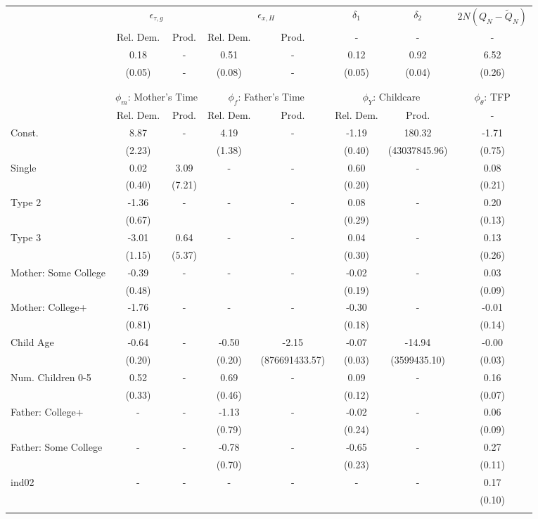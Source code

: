 \begin{tabular}{lccccccc}\toprule
 & \multicolumn{2}{c}{$\epsilon_{\tau,g}$} & \multicolumn{2}{c}{$\epsilon_{x,H}$} & {$\delta_{1}$} & {$\delta_{2}$} & $2N(Q_{N} - \tilde{Q}_{N})$ \\
 & Rel. Dem. & Prod. & Rel. Dem. & Prod. & - & - & - \\\cmidrule(r){2-3}\cmidrule(r){4-5}\cmidrule(r){6-6}\cmidrule(r){7-7}\cmidrule(r){8-8}
&0.18& - &0.51& - &0.12&0.92&6.52\\
&(0.05)& - &(0.08)& - &(0.05)&(0.04)&(0.26)\\
\\
&&&&&&&\\
 & \multicolumn{2}{c}{$\phi_{m}$: Mother's Time} & \multicolumn{2}{c}{$\phi_{f}$: Father's Time} & \multicolumn{2}{c}{$\phi_{Y}$: Childcare} &{$\phi_{\theta}$: TFP} \\
 & Rel. Dem. & Prod. & Rel. Dem. & Prod. & Rel. Dem. & Prod. & -  \\\cmidrule(r){2-3}\cmidrule(r){4-5}\cmidrule(r){6-7}\cmidrule(r){8-8}
Const.&8.87& -&4.19& -&-1.19&180.32&-1.71\\
&(2.23)&&(1.38)&&(0.40)&(43037845.96)&(0.75)\\
Single&0.02&3.09& - & -&0.60& -&0.08\\
&(0.40)&(7.21) & &&(0.20)&&(0.21)\\
Type 2&-1.36& -& - & -&0.08& -&0.20\\
&(0.67)& & &&(0.29)&&(0.13)\\
Type 3&-3.01&0.64& - & -&0.04& -&0.13\\
&(1.15)&(5.37) & &&(0.30)&&(0.26)\\
Mother: Some College&-0.39& -& - & -&-0.02& -&0.03\\
&(0.48)& & &&(0.19)&&(0.09)\\
Mother: College+&-1.76& -& - & -&-0.30& -&-0.01\\
&(0.81)& & &&(0.18)&&(0.14)\\
Child Age&-0.64& -&-0.50&-2.15&-0.07&-14.94&-0.00\\
&(0.20)&&(0.20)&(876691433.57)&(0.03)&(3599435.10)&(0.03)\\
Num. Children 0-5&0.52& -&0.69& -&0.09& -&0.16\\
&(0.33)&&(0.46)&&(0.12)&&(0.07)\\
Father: College+& - & -&-1.13& -&-0.02& -&0.06\\
 & &&(0.79)&&(0.24)&&(0.09)\\
Father: Some College& - & -&-0.78& -&-0.65& -&0.27\\
 & &&(0.70)&&(0.23)&&(0.11)\\
ind02& - & -& - & -& - & -&0.17\\
 & & & & & &&(0.10)\\
\\
\bottomrule\end{tabular}